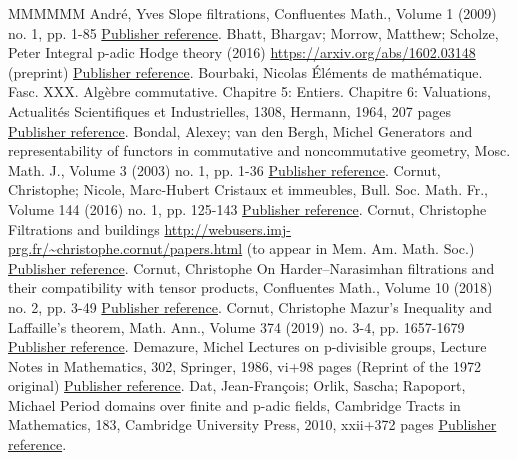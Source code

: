 \documentclass[11pt]{article}
\theoremstyle{definition}
\numberwithin{equation}{section}
\numberwithin{figure}{section}
\numberwithin{table}{section}
\begin{document}
\begin{thebibliography}{MMMMMM}
 André, Yves Slope filtrations, Confluentes Math., Volume 1 (2009) no. 1, pp. 1-85 \href{https://ahl.centre-mersenne.org/item/AHL_2019__2__415_0/#An09}{Publisher reference}.
 Bhatt, Bhargav; Morrow, Matthew; Scholze, Peter Integral p-adic Hodge theory (2016) \url{https://arxiv.org/abs/1602.03148} (preprint) \href{https://ahl.centre-mersenne.org/item/AHL_2019__2__415_0/#BaMoSc16}{Publisher reference}.
 Bourbaki, Nicolas Éléments de mathématique. Fasc. XXX. Algèbre commutative. Chapitre 5: Entiers. Chapitre 6: Valuations, Actualités Scientifiques et Industrielles, 1308, Hermann, 1964, 207 pages \href{https://ahl.centre-mersenne.org/item/AHL_2019__2__415_0/#BoAC56}{Publisher reference}.
 Bondal, Alexey; van den Bergh, Michel Generators and representability of functors in commutative and noncommutative geometry, Mosc. Math. J., Volume 3 (2003) no. 1, pp. 1-36 \href{https://ahl.centre-mersenne.org/item/AHL_2019__2__415_0/#BoVdB03}{Publisher reference}.
 Cornut, Christophe; Nicole, Marc-Hubert Cristaux et immeubles, Bull. Soc. Math. Fr., Volume 144 (2016) no. 1, pp. 125-143 \href{https://ahl.centre-mersenne.org/item/AHL_2019__2__415_0/#CoNi16}{Publisher reference}.
 Cornut, Christophe Filtrations and buildings \url{http://webusers.imj-prg.fr/~christophe.cornut/papers.html} (to appear in Mem. Am. Math. Soc.) \href{https://ahl.centre-mersenne.org/item/AHL_2019__2__415_0/#Co14}{Publisher reference}.
 Cornut, Christophe On Harder–Narasimhan filtrations and their compatibility with tensor products, Confluentes Math., Volume 10 (2018) no. 2, pp. 3-49 \href{https://ahl.centre-mersenne.org/item/AHL_2019__2__415_0/#Co16}{Publisher reference}.
 Cornut, Christophe Mazur’s Inequality and Laffaille’s theorem, Math. Ann., Volume 374 (2019) no. 3-4, pp. 1657-1679 \href{https://ahl.centre-mersenne.org/item/AHL_2019__2__415_0/#Co15}{Publisher reference}.
 Demazure, Michel Lectures on p-divisible groups, Lecture Notes in Mathematics, 302, Springer, 1986, vi+98 pages (Reprint of the 1972 original) \href{https://ahl.centre-mersenne.org/item/AHL_2019__2__415_0/#De86}{Publisher reference}.
 Dat, Jean-François; Orlik, Sascha; Rapoport, Michael Period domains over finite and p-adic fields, Cambridge Tracts in Mathematics, 183, Cambridge University Press, 2010, xxii+372 pages \href{https://ahl.centre-mersenne.org/item/AHL_2019__2__415_0/#DaOrRa10}{Publisher reference}.

\end{thebibliography}
\end{document}
